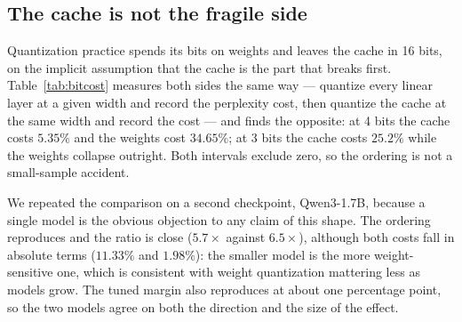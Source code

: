 \documentclass[10pt,journal]{IEEEtran}
\begin{document}
\subsection{The cache is not the fragile side}
\label{sec:results-bitcost}

Quantization practice spends its bits on weights and leaves the cache in 16
bits, on the implicit assumption that the cache is the part that breaks first.
Table~\ref{tab:bitcost} measures both sides the same way --- quantize every
linear layer at a given width and record the perplexity cost, then quantize the
cache at the same width and record the cost --- and finds the opposite: at 4 bits
the cache costs $5.35\%$ and the weights cost $34.65\%$; at 3 bits the cache costs
$25.2\%$ while the weights collapse outright. Both intervals exclude zero, so the
ordering is not a small-sample accident.

We repeated the comparison on a second checkpoint, Qwen3-1.7B, because a single
model is the obvious objection to any claim of this shape. The ordering
reproduces and the ratio is close ($5.7\times$ against $6.5\times$), although
both costs fall in absolute terms ($11.33\%$ and $1.98\%$): the smaller model is
the more weight-sensitive one, which is consistent with weight quantization
mattering less as models grow. The tuned margin also reproduces at about one
percentage point, so the two models agree on both the direction and the size of
the effect.
\end{document}
